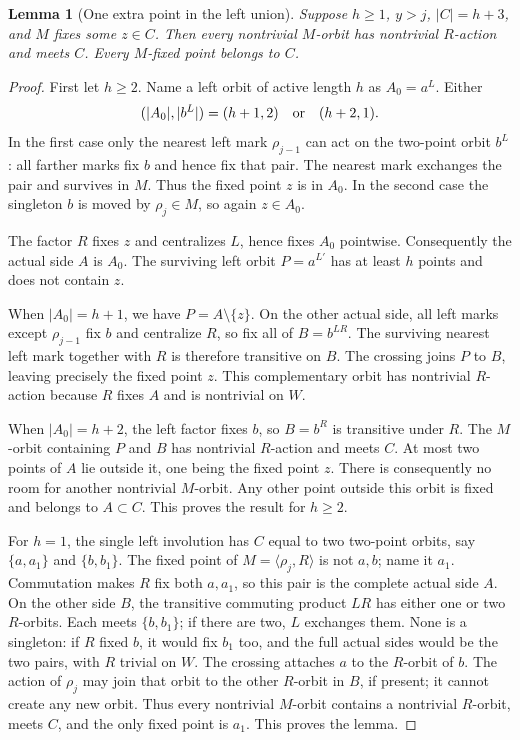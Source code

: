 \documentclass[11pt,a4paper]{article}
\newtheorem{lemma}{Lemma}
\newcommand{\gen}[1]{\langle#1\rangle}
\begin{document}
\begin{lemma}[One extra point in the left union]
Suppose $h\ge1$, $y>j$, $|C|=h+3$, and $M$ fixes
some $z\in C$. Then every nontrivial $M$-orbit
has nontrivial $R$-action and meets $C$. Every
$M$-fixed point belongs to $C$.
\end{lemma}
\begin{proof}
First let $h\ge2$. Name a left orbit of active
length $h$ as $A_0=a^L$. Either
\[
 (|A_0|,|b^L|)=(h+1,2)\quad\hbox{or}\quad(h+2,1).
\]
In the first case only the nearest left mark
$\rho_{j-1}$ can act on the two-point orbit $b^L$:
all farther marks fix $b$ and hence fix that pair.
The nearest mark exchanges the pair and survives
in $M$. Thus the fixed point $z$ is in $A_0$.
In the second case the singleton $b$ is moved
by $\rho_j\in M$, so again $z\in A_0$.

The factor $R$ fixes $z$ and centralizes $L$,
hence fixes $A_0$ pointwise. Consequently the
actual side $A$ is $A_0$. The surviving left
orbit $P=a^{L'}$ has at least $h$ points and
does not contain $z$.

When $|A_0|=h+1$, we have $P=A\setminus\{z\}$.
On the other actual side, all left marks except
$\rho_{j-1}$ fix $b$ and centralize $R$, so fix
all of $B=b^{LR}$. The surviving nearest left
mark together with $R$ is therefore transitive
on $B$. The crossing joins $P$ to $B$, leaving
precisely the fixed point $z$. This complementary
orbit has nontrivial $R$-action because $R$ fixes
$A$ and is nontrivial on $W$.

When $|A_0|=h+2$, the left factor fixes $b$, so
$B=b^R$ is transitive under $R$. The $M$-orbit
containing $P$ and $B$ has nontrivial $R$-action
and meets $C$. At most two points of $A$ lie
outside it, one being the fixed point $z$.
There is consequently no room for another
nontrivial $M$-orbit. Any other point outside
this orbit is fixed and belongs to $A\subset C$.
This proves the result for $h\ge2$.

For $h=1$, the single left involution has
$C$ equal to two two-point orbits, say
$\{a,a_1\}$ and $\{b,b_1\}$. The fixed point
of $M=\gen{\rho_j,R}$ is not $a,b$; name it
$a_1$. Commutation makes $R$ fix both $a,a_1$,
so this pair is the complete actual side $A$.
On the other side $B$, the transitive commuting
product $LR$ has either one or two $R$-orbits.
Each meets $\{b,b_1\}$; if there are two, $L$
exchanges them. None is a singleton: if $R$
fixed $b$, it would fix $b_1$ too, and the full
actual sides would be the two pairs, with
$R$ trivial on $W$. The crossing attaches $a$
to the $R$-orbit of $b$. The action of $\rho_j$
may join that orbit to the other $R$-orbit in
$B$, if present; it cannot create any new orbit.
Thus every nontrivial $M$-orbit contains a
nontrivial $R$-orbit, meets $C$, and the only
fixed point is $a_1$. This proves the lemma.
\end{proof}
\end{document}
